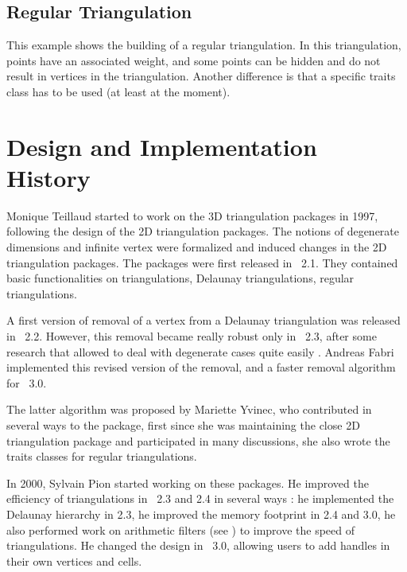 {

\subsection{Regular Triangulation}
This example shows the building of a regular triangulation.  In this
triangulation, points have an associated weight, and some points can
be hidden and do not result in vertices in the triangulation.
Another difference is that a specific traits class has to be used
(at least at the moment).


\section{Design and Implementation History}

Monique Teillaud started to work on the 3D triangulation packages in
1997, following the design of the 2D triangulation packages. The
notions of degenerate dimensions and infinite vertex were formalized
\cite{t-tdtc-99} and induced changes in the 2D triangulation
packages. The packages were first released in \cgal\ 2.1. They contained
basic functionalities on triangulations, Delaunay triangulations,
regular triangulations.

A first version of removal of a vertex from a Delaunay triangulation
was released in \cgal\ 2.2. However, this removal became really robust
only in \cgal\ 2.3, after some research that allowed to deal with
degenerate cases quite easily \cite{cgal:dt-pvr3d-03}. Andreas Fabri
implemented this revised version of the removal, and a faster removal
algorithm for \cgal\ 3.0. 

The latter algorithm was proposed by Mariette Yvinec, who contributed
in several ways to the package, first since she was maintaining the
close 2D triangulation package and participated in many discussions,
she also wrote the traits classes for regular triangulations.

In 2000, Sylvain Pion started working on these packages.  He improved
the efficiency of triangulations in \cgal\ 2.3 and 2.4 in several ways
\cite{cgal:bdpty-tc-02}: he implemented the Delaunay hierarchy
\cite{cgal:d-dh-02} in 2.3, he improved the memory footprint in 2.4
and 3.0, he also performed work on arithmetic filters
\cite{cgal:dp-eegpd-03} (see ) to improve
the speed of triangulations.  He changed the design in \cgal\ 3.0,
allowing users to add handles in their own vertices and cells.

}
